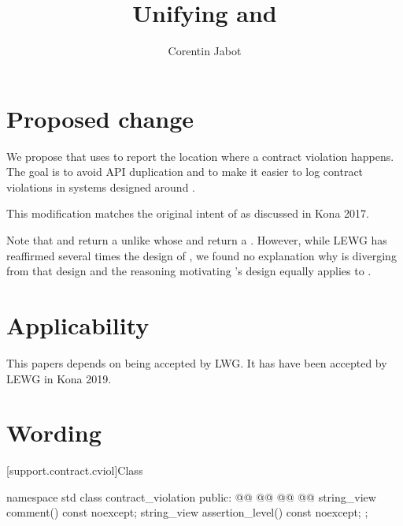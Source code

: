 \documentclass{wg21}
\title{Unifying \tcode{source\_location} and \tcode{contract\_violation}}
\author{Corentin Jabot}{corentin.jabot@gmail.com}
\begin{document}
\maketitle

\section{Proposed change}

We propose that  uses 
to report the location where a contract violation happens.
The goal is to avoid API duplication and to make it easier to log contract violations
in systems designed around  .

This modification matches the original intent of \cite{P0542} as discussed in Kona 2017.


Note that  and 
return a  unlike  whose 
and  return a .
However, while LEWG has reaffirmed several times the design of ,
we found no explanation why  is diverging from that design and
the reasoning motivating 's design equally applies  to .


\section{Applicability}

This papers depends on \cite{P1208} being accepted by LWG.
It has have been accepted by LEWG in Kona 2019.

\section{Wording}

[support.contract.cviol]{Class }
%

\begin{codeblock}
	namespace std {
		class contract_violation {
			public:
			@@
			@@
			@@
			@@
			string_view comment() const noexcept;
			string_view assertion_level() const noexcept;
		};
	}
\end{codeblock}
\end{document}
